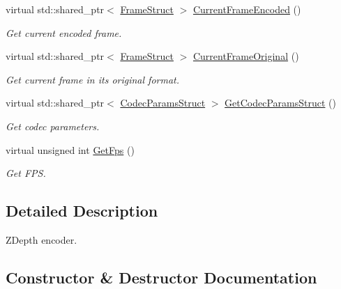 \begin{DoxyCompactItemize}
virtual std\+::shared\+\_\+ptr$<$ \hyperlink{structmoetsi_1_1ssp_1_1FrameStruct}{Frame\+Struct} $>$ \hyperlink{classmoetsi_1_1ssp_1_1ZDepthEncoder_a075752f62bbc40f71026812c5548ef5f}{Current\+Frame\+Encoded} ()
\begin{DoxyCompactList}\small\item\em Get current encoded frame. \end{DoxyCompactList}\item 
virtual std\+::shared\+\_\+ptr$<$ \hyperlink{structmoetsi_1_1ssp_1_1FrameStruct}{Frame\+Struct} $>$ \hyperlink{classmoetsi_1_1ssp_1_1ZDepthEncoder_abe5820ee0dea5fec22e398a7ba4d6777}{Current\+Frame\+Original} ()
\begin{DoxyCompactList}\small\item\em Get current frame in its original format. \end{DoxyCompactList}\item 
virtual std\+::shared\+\_\+ptr$<$ \hyperlink{structmoetsi_1_1ssp_1_1CodecParamsStruct}{Codec\+Params\+Struct} $>$ \hyperlink{classmoetsi_1_1ssp_1_1ZDepthEncoder_a3fc9f84387dba09d1deb4761031b598f}{Get\+Codec\+Params\+Struct} ()
\begin{DoxyCompactList}\small\item\em Get codec parameters. \end{DoxyCompactList}\item 
virtual unsigned int \hyperlink{classmoetsi_1_1ssp_1_1ZDepthEncoder_a9ea0a5783d7d265fccc3a2c262600552}{Get\+Fps} ()
\begin{DoxyCompactList}\small\item\em Get F\+PS. \end{DoxyCompactList}\end{DoxyCompactItemize}


\subsection{Detailed Description}
Z\+Depth encoder. 

\subsection{Constructor \& Destructor Documentation}
\mbox{\label{classmoetsi_1_1ssp_1_1ZDepthEncoder_a97902734a32136d68782f4b8c9bf111c}} 
